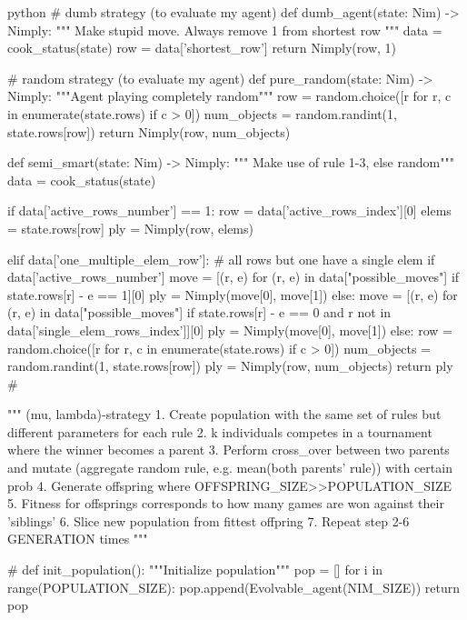 \begin{mintedbox}{python}
    # dumb strategy (to evaluate my agent)
    def dumb_agent(state: Nim) -> Nimply:
        """
        Make stupid move. Always remove 1 from shortest row
        """
        data = cook_status(state)
        row = data['shortest_row']
        return Nimply(row, 1)


    # random strategy (to evaluate my agent)
    def pure_random(state: Nim) -> Nimply:
        """Agent playing completely random"""
        row = random.choice([r for r, c in enumerate(state.rows) if c > 0])
        num_objects = random.randint(1, state.rows[row])
        return Nimply(row, num_objects)


    def semi_smart(state: Nim) -> Nimply:
        """ Make use of rule 1-3, else random"""
        data = cook_status(state)

        if data['active_rows_number'] == 1:
            row = data['active_rows_index'][0]
            elems = state.rows[row]
            ply = Nimply(row, elems)

        elif data['one_multiple_elem_row']:  # all rows but one have a single elem
            if data['active_rows_number'] %
                move = [(r, e) for (r, e) in data["possible_moves"] if state.rows[r] - e == 1][0]
                ply = Nimply(move[0], move[1])
            else:
                move = [(r, e) for (r, e) in data["possible_moves"] if
                        state.rows[r] - e == 0 and r not in data['single_elem_rows_index']][0]
                ply = Nimply(move[0], move[1])
        else:
            row = random.choice([r for r, c in enumerate(state.rows) if c > 0])
            num_objects = random.randint(1, state.rows[row])
            ply = Nimply(row, num_objects)
        return ply
    # %

    """
    (mu, lambda)-strategy
        1. Create population with the same set of rules but different parameters for each rule
        2. k individuals competes in a tournament where the winner becomes a parent
        3. Perform cross_over between two parents and mutate (aggregate random rule, e.g. mean(both parents' rule)) with certain prob
        4. Generate offspring where OFFSPRING_SIZE>>POPULATION_SIZE
        5. Fitness for offsprings corresponds to how many games are won against their 'siblings'
        6. Slice new population from fittest offpring
        7. Repeat step 2-6 GENERATION times
    """

    # %
    def init_population():
        """Initialize population"""
        pop = []
        for i in range(POPULATION_SIZE):
            pop.append(Evolvable_agent(NIM_SIZE))
        return pop



\end{mintedbox}
